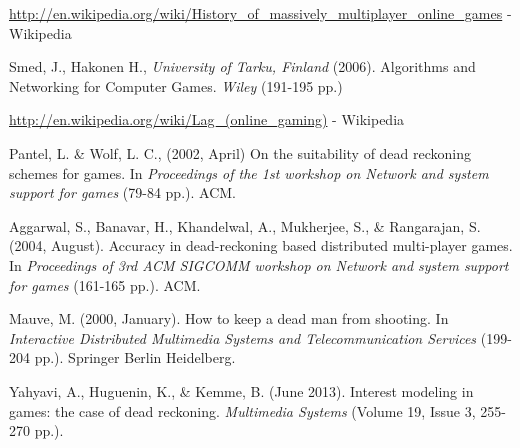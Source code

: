 \documentclass[a4paper,11pt]{article}
\begin{document}
%
%
%
%

\begin{thebibliography}{100}

 \small{\url{http://en.wikipedia.org/wiki/History_of_massively_multiplayer_online_games} } - Wikipedia

 Smed, J., Hakonen H., \emph{University of Tarku, Finland} (2006). Algorithms and Networking
for Computer Games. \emph{Wiley} (191-195 pp.)  

 \url{http://en.wikipedia.org/wiki/Lag_(online_gaming)} - Wikipedia

 Pantel, L. \& Wolf, L. C., (2002, April) On the suitability of dead reckoning schemes for games. In \emph{Proceedings of the 1st workshop on Network and system support for games} (79-84 pp.). ACM.

 Aggarwal, S., Banavar, H., Khandelwal, A., Mukherjee, S., \& Rangarajan, S. (2004, August). Accuracy in dead-reckoning based distributed multi-player games. In \emph{Proceedings of 3rd ACM SIGCOMM workshop on Network and system support for games} (161-165 pp.). ACM.

 Mauve, M. (2000, January). How to keep a dead man from shooting. In \emph{Interactive Distributed Multimedia Systems and Telecommunication Services} (199-204 pp.). Springer Berlin Heidelberg.

 Yahyavi, A., Huguenin, K., \& Kemme, B. (June 2013). Interest modeling in games: the case of dead reckoning. \emph{Multimedia Systems}  (Volume 19, Issue 3, 255-270 pp.).

\end{thebibliography}
\end{document}
